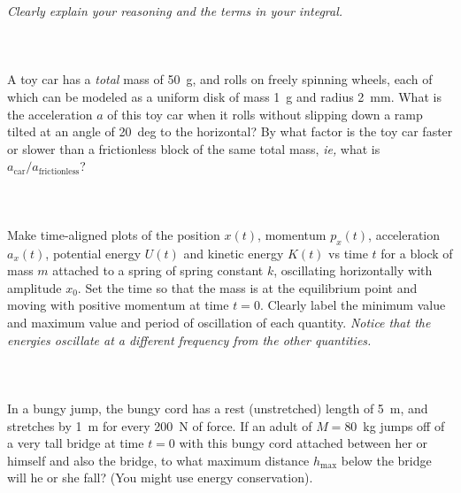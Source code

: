 \documentclass[12pt]{article}
\newcounter{problem}
\begin{document}
\emph{Clearly explain your reasoning and the terms in your integral.}

\paragraph{\problemname~\theproblem}

A toy car has a \emph{total} mass of 50~g, and rolls on freely
spinning wheels, each of which can be modeled as a uniform disk of
mass 1~g and radius 2~mm.  What is the acceleration $a$ of this toy
car when it rolls without slipping down a ramp tilted at an angle of
20~deg to the horizontal?  By what factor is the toy car faster or
slower than a frictionless block of the same total mass, \textit{ie,}
what is $a_\mathrm{car}/a_\mathrm{frictionless}$?

\paragraph{\problemname~\theproblem}

Make time-aligned plots of the position $x(t)$, momentum $p_x(t)$,
acceleration $a_x(t)$, potential energy $U(t)$ and kinetic energy
$K(t)$ vs time $t$ for a block of mass $m$ attached to a spring of
spring constant $k$, oscillating horizontally with amplitude $x_0$.
Set the time so that the mass is at the equilibrium point and moving
with positive momentum at time $t=0$.  Clearly label the minimum value
and maximum value and period of oscillation of each quantity.
\emph{Notice that the energies oscillate at a different frequency from
the other quantities.}

\paragraph{\problemname~\theproblem}

In a bungy jump, the bungy cord has a rest (unstretched) length of
5~m, and stretches by 1~m for every 200~N of force.  If an adult of
$M=80$~kg jumps off of a very tall bridge at time $t=0$ with this
bungy cord attached between her or himself and also the bridge, to
what maximum distance $h_\mathrm{max}$ below the bridge will he or she
fall?  (You might use energy conservation).

\paragraph{\problemname~\theproblem}
\end{document}
